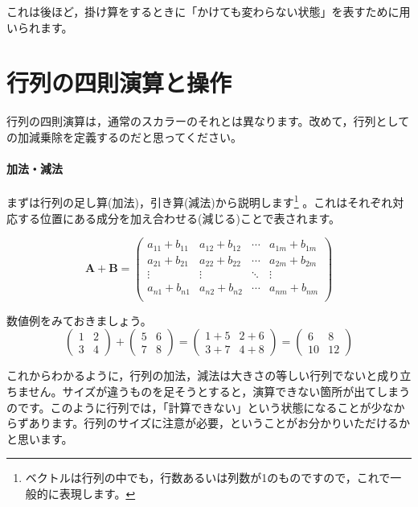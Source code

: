 \documentclass{ltjsbook}
\begin{document}
これは後ほど，掛け算をするときに「かけても変わらない状態」を表すために用いられます。



\section{行列の四則演算と操作}
行列の四則演算は，通常のスカラーのそれとは異なります。改めて，行列としての加減乗除を定義するのだと思ってください。

\paragraph{加法・減法}
まずは行列の足し算(加法)，引き算(減法)から説明します\footnote{ベクトルは行列の中でも，行数あるいは列数が1のものですので，これで一般的に表現します。} 。これはそれぞれ対応する位置にある成分を加え合わせる(減じる)ことで表されます。

\begin{equation*}
	\bm{A}+\bm{B} =
	\begin{pmatrix}
		a_{11}+b_{11} & a_{12}+b_{12} & \cdots & a_{1m}+b_{1m} \\
		a_{21}+b_{21} & a_{22}+b_{22} & \cdots & a_{2m}+b_{2m} \\
		\vdots        & \vdots        & \ddots & \vdots        \\
		a_{n1}+b_{n1} & a_{n2}+b_{n2} & \cdots & a_{nm}+b_{nm} \\
	\end{pmatrix}
\end{equation*}

数値例をみておきましょう。
\begin{equation*}
	\begin{pmatrix}
		1 & 2 \\
		3 & 4
	\end{pmatrix}
	+
	\begin{pmatrix}
		5 & 6 \\
		7 & 8
	\end{pmatrix}
	=
	\begin{pmatrix}
		1+5 & 2+6 \\
		3+7 & 4+8
	\end{pmatrix}
	=
	\begin{pmatrix}
		6  & 8  \\
		10 & 12
	\end{pmatrix}
\end{equation*}

これからわかるように，行列の加法，減法は大きさの等しい行列でないと成り立ちません。サイズが違うものを足そうとすると，演算できない箇所が出てしまうのです。このように行列では，「計算できない」という状態になることが少なからずあります。行列のサイズに注意が必要，ということがお分かりいただけるかと思います。
\end{document}
